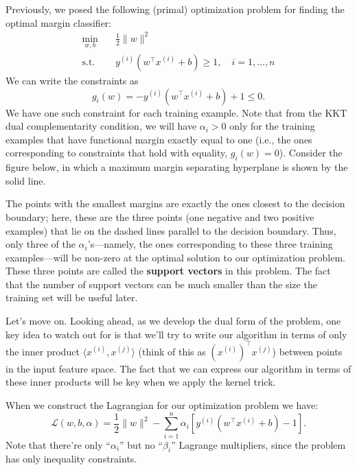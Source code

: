 Previously, we posed the following (primal) optimization problem for finding
the optimal margin classifier:
\begin{align}
    \min_{w,b} \quad& \frac{1}{2}\lVert w \rVert^2\label{eq:opt_margin_classifier}\\
    \operatorname{s.t.} \quad& y^{(i)} (w^\top x^{(i)} + b) \ge 1, \quad i = 1,\ldots ,n
\end{align}
We can write the constraints as
\begin{equation*}
    g_i (w) = -y^{(i)} (w^\top x^{(i)} + b) + 1 \le 0.
\end{equation*}
We have one such constraint for each training example. Note that from the
KKT dual complementarity condition, we will have $\alpha_i > 0$ only for the training
examples that have functional margin exactly equal to one (i.e., the ones
corresponding to constraints that hold with equality, $g_i (w) = 0$). Consider
the figure below, in which a maximum margin separating hyperplane is shown
by the solid line.

The points with the smallest margins are exactly the ones closest to the
decision boundary; here, these are the three points (one negative and two positive
examples) that lie on the dashed lines parallel to the decision boundary.
Thus, only three of the $\alpha_i$'s---namely, the ones corresponding to these three
training examples---will be non-zero at the optimal solution to our optimization
problem. These three points are called the \textbf{support vectors} in this
problem. The fact that the number of support vectors can be much smaller
than the size the training set will be useful later.

Let's move on. Looking ahead, as we develop the dual form of the problem,
one key idea to watch out for is that we'll try to write our algorithm
in terms of only the inner product $\langle x^{(i)} ,x^{(j)} \rangle$ (think of this as $(x^{(i)} )^\top x^{(j)}$)
between points in the input feature space. The fact that we can express our
algorithm in terms of these inner products will be key when we apply the
kernel trick.

When we construct the Lagrangian for our optimization problem we have:
\begin{equation*}
    \mathcal L(w,b,\alpha) = \frac 1 2 \lVert w \rVert^2 - \sum_{i=1}^n \alpha_i \left[y^{(i)} (w^\top x^{(i)} + b) - 1 \right].\label{eq:lagrangian_svm}
\end{equation*}
Note that there're only ``$\alpha_i$'' but no ``$\beta_i$'' Lagrange multipliers, since the
problem has only inequality constraints.


